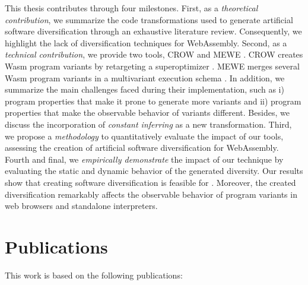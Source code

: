 This thesis contributes through four milestones. First, as a \emph{theoretical contribution}, we summarize the code transformations used to generate artificial software diversification through an exhaustive literature review. Consequently, we highlight the lack of diversification techniques for WebAssembly.
Second, as a \emph{technical contribution}, we provide two tools, CROW \cite{CROW} and MEWE \cite{MEWE}. CROW creates 
Wasm program variants by retargeting a superoptimizer \cite{Sasnauskas2017Souper:Superoptimizer}.
MEWE merges several Wasm program variants in a multivariant execution schema \cite{okhravi2013survey}.
In addition, we summarize the main challenges faced during their implementation, such as i) program properties that make it prone to generate more variants and ii) program properties that make the observable behavior of variants different. 
Besides, we discuss the incorporation of \emph{constant inferring} as a new transformation. 
Third, we propose a \emph{methodology} to quantitatively evaluate the impact of our tools, assessing the creation of artificial software diversification for WebAssembly. 
Fourth and final, we \emph{empirically demonstrate} the impact of our technique by evaluating the static and dynamic behavior of the generated diversity.
Our results show that creating software diversification is feasible for \wasm. 
Moreover, the created diversification remarkably affects the observable behavior of program variants in web browsers and standalone interpreters.

\section{Publications}

This work is based on the following publications:

